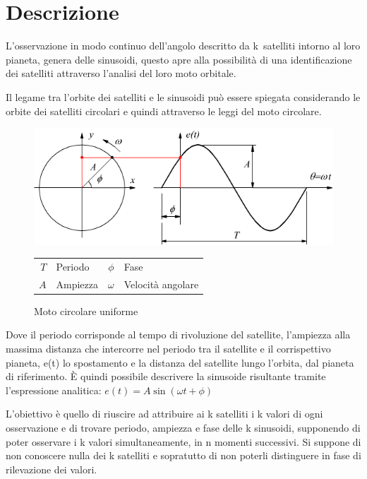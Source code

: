 \documentclass[a4paper,12pt]{report}
\begin{document}
\section{Descrizione}
L'osservazione in modo continuo dell'angolo descritto da  k~satelliti intorno al loro pianeta, genera delle sinusoidi, questo apre alla possibilità di una identificazione dei satelliti attraverso l'analisi del loro moto orbitale.

Il legame tra l'orbite dei satelliti e le sinusoidi può essere spiegata considerando le orbite dei satelliti circolari e quindi attraverso le leggi del moto circolare.
\begin{figure}[H]
  \caption{Moto circolare uniforme}
  \begin{center}
  \includegraphics[scale=0.50]{img/sinusoide_cerchio.png}
  \begin{tabular}{r@{: }l r@{: }l}
  $T$ & Periodo & $\phi$ & Fase \\
  $A$ & Ampiezza & $\omega$ & Velocità angolare
  \end{tabular}
  \end{center}
\end{figure}


Dove il periodo corrisponde al tempo di rivoluzione del satellite, l'ampiezza alla massima distanza che intercorre nel periodo tra il satellite e il corrispettivo pianeta, e(t) lo spostamento e la distanza del satellite lungo l'orbita, dal pianeta di riferimento. È quindi possibile descrivere la sinusoide risultante tramite l'espressione analitica:
$ e(t) = A\sin(\omega t + \phi)$



L'obiettivo è quello di riuscire ad attribuire ai k satelliti i k valori di
ogni osservazione e di trovare periodo, ampiezza e fase delle k sinusoidi,
supponendo di poter osservare i k valori simultaneamente, in n momenti
successivi. Si suppone di non conoscere nulla dei k satelliti e sopratutto di non poterli distinguere in fase di rilevazione dei valori.
\end{document}

